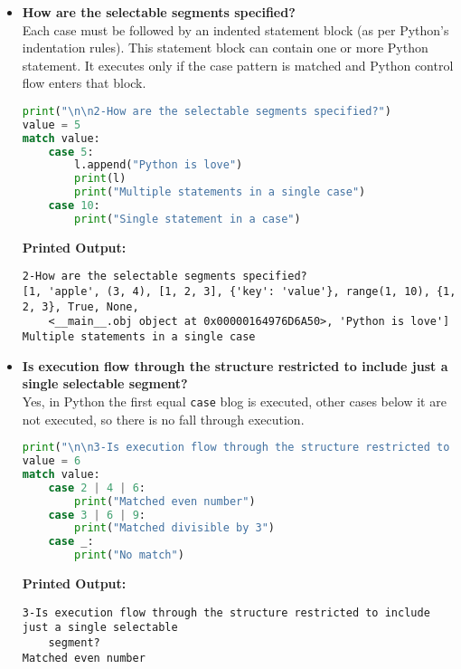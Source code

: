 \documentclass{article}
\begin{document}
\begin{itemize}
\item \textbf{How are the selectable segments specified?} \\
Each case must be followed by an indented statement block (as per Python’s indentation rules). This statement block can contain one or more Python statement. It executes only if the case pattern is matched and Python control flow enters that block.
\begin{lstlisting}[language=Python]
print("\n\n2-How are the selectable segments specified?")
value = 5
match value:
    case 5:
        l.append("Python is love")
        print(l)
        print("Multiple statements in a single case")
    case 10:
        print("Single statement in a case")
\end{lstlisting}
\textbf{Printed Output:} \begin{verbatim}
2-How are the selectable segments specified?
[1, 'apple', (3, 4), [1, 2, 3], {'key': 'value'}, range(1, 10), {1, 2, 3}, True, None, 
    <__main__.obj object at 0x00000164976D6A50>, 'Python is love']
Multiple statements in a single case
\end{verbatim}



\item \textbf{Is execution flow through the structure restricted to include just a single selectable segment?} \\
Yes, in Python the first equal \texttt{case} blog is executed, other cases below it are not executed, so there is no fall through execution.
\begin{lstlisting}[language=Python]
print("\n\n3-Is execution flow through the structure restricted to include just a single selectable segment?")
value = 6
match value:
    case 2 | 4 | 6:
        print("Matched even number")
    case 3 | 6 | 9:
        print("Matched divisible by 3")
    case _:
        print("No match")
\end{lstlisting}
\textbf{Printed Output:} 
\begin{verbatim}
3-Is execution flow through the structure restricted to include just a single selectable 
    segment?
Matched even number
\end{verbatim}




\end{itemize}
\end{document}
